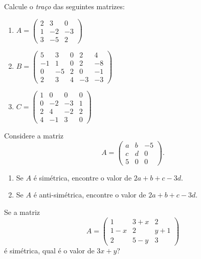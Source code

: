 \documentclass[12pt]{exam}
\begin{document}
    \vspace{.3cm}

    \questao{} Calcule o \textit{traço} das seguintes matrizes:
    \begin{enumerate}
        \item $A = \begin{pmatrix}2 & 3 & 0\\1 & -2 & -3\\3 & -5 & 2\end{pmatrix}$
        \item $B = \begin{pmatrix}5 & 3 & 0 & 2 & 4\\-1 & 1 & 0 & 2 & -8\\0 & -5 & 2 & 0 & -1\\2 & 3 & 4 & -3 & -3\end{pmatrix}$
        \item $C = \begin{pmatrix}1 & 0 & 0 & 0\\0 & -2 & -3 & 1\\2 & 4 & -2 & 2\\4 & -1 & 3 & 0\end{pmatrix}$
    \end{enumerate}

    \vspace{.3cm}

    \questao{}Considere a matriz
        \[
            A = \begin{pmatrix}a & b & -5\\c & d & 0\\5 & 0 & 0\end{pmatrix}.
        \]
        \begin{enumerate}
            \item Se $A$ é simétrica, encontre o valor de $2a + b + c - 3d$.
            \item Se $A$ é anti-simétrica, encontre o valor de $2a + b + c - 3d$.
        \end{enumerate}

    \vspace{.3cm}

    \questao{}Se a matriz
        \[
            A = \begin{pmatrix}1 & 3 + x & 2\\1 - x & 2 & y + 1\\2 & 5 - y & 3\end{pmatrix}
        \]
        é simétrica, qual é o valor de $3x + y$?
\end{document}
